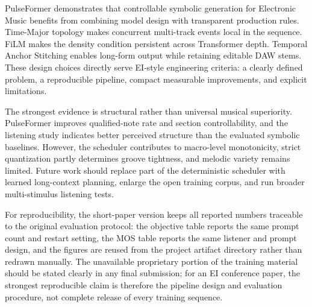 \documentclass[11pt,twocolumn,a4paper]{article}
\makeatletter
\renewcommand\section{\@startsection{section}{1}{0pt}{1.0ex plus .2ex}{0.6ex}{\centering\normalfont\bfseries}}
\makeatother
\begin{document}
\section{Discussion and Conclusion}
PulseFormer demonstrates that controllable symbolic generation for Electronic Music benefits from combining model design with transparent production rules. Time-Major topology makes concurrent multi-track events local in the sequence. FiLM makes the density condition persistent across Transformer depth. Temporal Anchor Stitching enables long-form output while retaining editable DAW stems. These design choices directly serve EI-style engineering criteria: a clearly defined problem, a reproducible pipeline, compact measurable improvements, and explicit limitations.

The strongest evidence is structural rather than universal musical superiority. PulseFormer improves qualified-note rate and section controllability, and the listening study indicates better perceived structure than the evaluated symbolic baselines. However, the scheduler contributes to macro-level monotonicity, strict quantization partly determines groove tightness, and melodic variety remains limited. Future work should replace part of the deterministic scheduler with learned long-context planning, enlarge the open training corpus, and run broader multi-stimulus listening tests.

For reproducibility, the short-paper version keeps all reported numbers traceable to the original evaluation protocol: the objective table reports the same prompt count and restart setting, the MOS table reports the same listener and prompt design, and the figures are reused from the project artifact directory rather than redrawn manually. The unavailable proprietary portion of the training material should be stated clearly in any final submission; for an EI conference paper, the strongest reproducible claim is therefore the pipeline design and evaluation procedure, not complete release of every training sequence.
\end{document}
